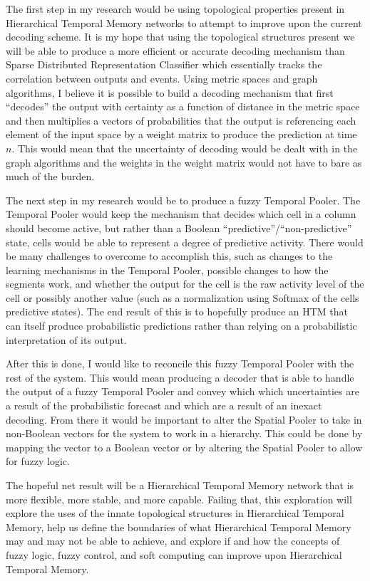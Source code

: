 \documentclass[fleqn,notitlepage,minimal]{article}
\begin{document}
	The first step in my research would be using topological properties present in Hierarchical Temporal Memory networks to attempt to improve upon the current decoding scheme. It is my hope that using the topological structures present we will be able to produce a more efficient or accurate decoding mechanism than Sparse Distributed Representation Classifier which essentially tracks the correlation between outputs and events. Using metric spaces and graph algorithms, I believe it is possible to build a decoding mechanism that first ``decodes'' the output with certainty as a function of distance in the metric space and then multiplies a vectors of probabilities that the output is referencing each element of the input space by a weight matrix to produce the prediction at time $n$. This would mean that the uncertainty of decoding would be dealt with in the graph algorithms and the weights in the weight matrix would not have to bare as much of the burden.
	
	The next step in my research would be to produce a fuzzy Temporal Pooler. The Temporal Pooler would keep the mechanism that decides which cell in a column should become active, but rather than a Boolean ``predictive''/``non-predictive'' state, cells would be able to represent a degree of predictive activity. There would be many challenges to overcome to accomplish this, such as changes to the learning mechanisms in the Temporal Pooler, possible changes to how the segments work, and whether the output for the cell is the raw activity level of the cell or possibly another value (such as a normalization using Softmax of the cells predictive states). The end result of this is to hopefully produce an HTM that can itself produce probabilistic predictions rather than relying on a probabilistic interpretation of its output.
	
	After this is done, I would like to reconcile this fuzzy Temporal Pooler with the rest of the system. This would mean producing a decoder that is able to handle the output of a fuzzy Temporal Pooler and convey which which uncertainties are a result of the probabilistic forecast and which are a result of an inexact decoding. From there it would be important to alter the Spatial Pooler to take in non-Boolean vectors for the system to work in a hierarchy. This could be done by mapping the vector to a Boolean vector or by altering the Spatial Pooler to allow for fuzzy logic.
	
	The hopeful net result will be a Hierarchical Temporal Memory network that is more flexible, more stable, and more capable. Failing that, this exploration will explore the uses of the innate topological structures in Hierarchical Temporal Memory, help us define the boundaries of what Hierarchical Temporal Memory may and may not be able to achieve, and explore if and how the concepts of fuzzy logic, fuzzy control, and soft computing can improve upon Hierarchical Temporal Memory.
	
\end{document}
